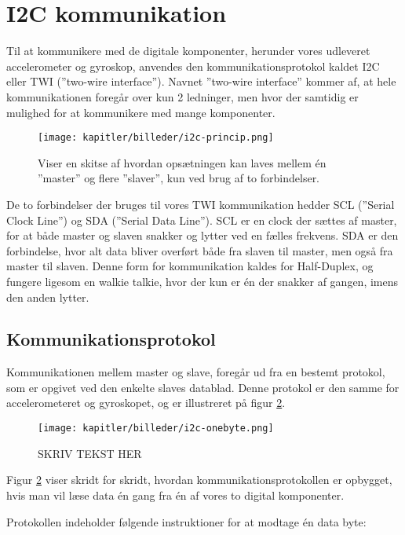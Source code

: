 \newpage
\section{I2C kommunikation}
Til at kommunikere med de digitale komponenter, herunder vores udleveret accelerometer og gyroskop, anvendes den kommunikationsprotokol kaldet I2C eller TWI (”two-wire interface”). Navnet ”two-wire interface” kommer af, at hele kommunikationen foregår over kun 2 ledninger, men hvor der samtidig er mulighed for at kommunikere med mange komponenter.

\begin{figure}[ht]
    \centering
    \texttt{[image: kapitler/billeder/i2c-princip.png]}
    \caption{Viser en skitse af hvordan opsætningen kan laves mellem
én ”master” og flere ”slaver”, kun ved brug af to forbindelser.}
    \label{fig:i2cprincip}
\end{figure}

De to forbindelser der bruges til vores TWI kommunikation hedder SCL (”Serial Clock Line”) og SDA (”Serial Data Line”). SCL er en clock der sættes af master, for at både master og slaven snakker og lytter ved en fælles frekvens. SDA er den forbindelse, hvor alt data bliver overført både fra slaven til master, men også fra master til slaven. Denne form for kommunikation kaldes for Half-Duplex, og fungere ligesom en walkie talkie, hvor der kun er én der snakker af gangen, imens den anden lytter.

\subsection{Kommunikationsprotokol}

Kommunikationen mellem master og slave, foregår ud fra en bestemt protokol, som er opgivet ved den enkelte slaves datablad. Denne protokol er den samme for accelerometeret og gyroskopet, og er illustreret på figur \ref{fig:i2conebyte}. 

\begin{figure}[ht]
    \centering
    \texttt{[image: kapitler/billeder/i2c-onebyte.png]}
    \caption{SKRIV TEKST HER}
    \label{fig:i2conebyte}
\end{figure}

Figur \ref{fig:i2conebyte} viser skridt for skridt, hvordan kommunikationsprotokollen er opbygget, hvis man vil læse data én gang fra én af vores to digital komponenter.

Protokollen indeholder følgende instruktioner for at modtage én data byte:

